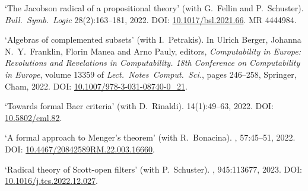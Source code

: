 \documentclass[a4paper]{article}
\begin{document}
\begin{flushleft}
\begin{thebibliography}{10}
\newblock `The {J}acobson radical of a propositional theory' (with G.~Fellin and P.~Schuster).
\newblock \emph{Bull.~Symb.~Logic} 28(2):163--181, 2022.
\newblock DOI: \href{https://doi.org/10.1017/bsl.2021.66}{10.1017/bsl.2021.66}.
\newblock MR 4444984.

\newblock `Algebras of complemented subsets' (with I.~Petrakis).
\newblock  In Ulrich Berger, Johanna N.~Y.~Franklin, Florin Manea and Arno Pauly, editors, {\em Computability in Europe: Revolutions and Revelations in Computability. 18th Conference on Computability in Europe},
\newblock volume 13359 of {\em Lect.~Notes~Comput.~Sci.}, pages 246--258, Springer, Cham, 2022.
\newblock DOI: \href{https://doi.org/10.1007/978-3-031-08740-0_21}{10.1007/978-3-031-08740-0\_21}.

\newblock `Towards formal Baer criteria' (with D.~Rinaldi).
 14(1):49--63, 2022.
\newblock DOI: \href{https://doi.org/10.5802/cml.82}{10.5802/cml.82}.

\newblock `A formal approach to Menger's theorem' (with R.~Bonacina).
, 57:45--51, 2022.
\newblock DOI: \href{https://doi.org/10.4467/20842589RM.22.003.16660}{10.4467/20842589RM.22.003.16660}.

\newblock `Radical theory of Scott-open filters' (with P.~Schuster).
, 945:113677, 2023.
\newblock DOI: \href{https://doi.org/10.1016/j.tcs.2022.12.027}{10.1016/j.tcs.2022.12.027}.


\end{thebibliography}


\end{flushleft}
\end{document}
